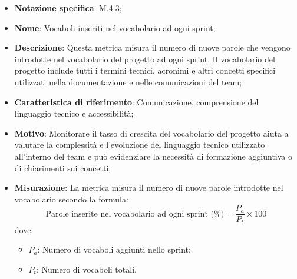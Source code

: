 \begin{itemize}
    \item \textbf{Notazione specifica}: M.4.3;
    \item \textbf{Nome}: Vocaboli inseriti nel vocabolario ad ogni sprint;
    \item \textbf{Descrizione}: Questa metrica misura il numero di nuove parole che vengono introdotte nel vocabolario del progetto ad ogni sprint. Il vocabolario del progetto include tutti i termini tecnici, acronimi e altri concetti specifici utilizzati nella documentazione e nelle comunicazioni del team;
    \item \textbf{Caratteristica di riferimento}: Comunicazione, comprensione del linguaggio tecnico e accessibilità;
    \item \textbf{Motivo}: Monitorare il tasso di crescita del vocabolario del progetto aiuta a valutare la complessità e l'evoluzione del linguaggio tecnico utilizzato all'interno del team e può evidenziare la necessità di formazione aggiuntiva o di chiarimenti sui concetti;
    \item \textbf{Misurazione}: La metrica misura il numero di nuove parole introdotte nel vocabolario secondo la formula:
    \[
        \text{Parole inserite nel vocabolario ad ogni sprint (\%)} =\frac{P_{a}}{P_{t}} \times 100 
    \]
    dove:
    \begin{itemize}
        \item $P_{a}$: Numero di vocaboli aggiunti nello sprint;
        \item $P_{t}$: Numero di vocaboli totali.
    \end{itemize}
    
    
\end{itemize}
